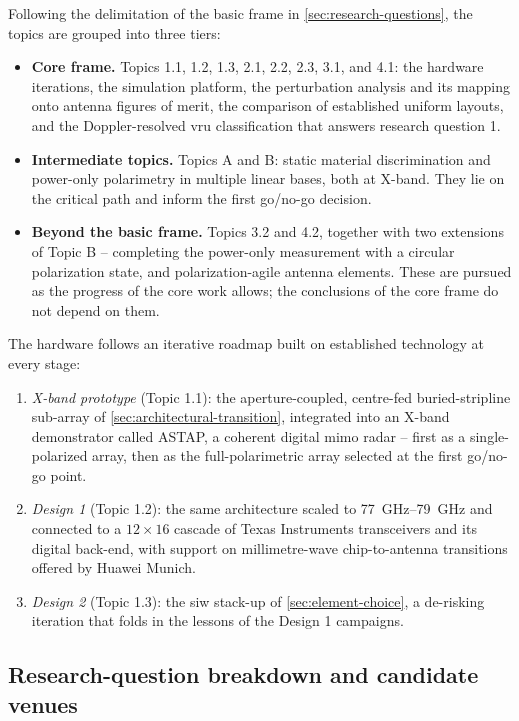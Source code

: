 Following the delimitation of the basic frame in \cref{sec:research-questions}, the topics are grouped into three tiers:
\begin{itemize}
    \item \textbf{Core frame.} Topics 1.1, 1.2, 1.3, 2.1, 2.2, 2.3, 3.1, and 4.1: the hardware iterations, the simulation platform, the perturbation analysis and its mapping onto antenna figures of merit, the comparison of established uniform layouts, and the Doppler-resolved \gls{vru} classification that answers research question 1.
    \item \textbf{Intermediate topics.} Topics A and B: static material discrimination and power-only polarimetry in multiple linear bases, both at X-band.
    They lie on the critical path and inform the first go/no-go decision.
    \item \textbf{Beyond the basic frame.} Topics 3.2 and 4.2, together with two extensions of Topic B -- completing the power-only measurement with a circular polarization state, and polarization-agile antenna elements.
    These are pursued as the progress of the core work allows; the conclusions of the core frame do not depend on them.
\end{itemize}

The hardware follows an iterative roadmap built on established technology at every stage:
\begin{enumerate}
    \item \textit{X-band prototype} (Topic 1.1): the aperture-coupled, centre-fed buried-stripline sub-array of \cref{sec:architectural-transition}, integrated into an X-band demonstrator called ASTAP, a coherent digital \gls{mimo} radar -- first as a single-polarized array, then as the full-polarimetric array selected at the first go/no-go point.
    \item \textit{Design 1} (Topic 1.2): the same architecture scaled to \qtyrange{77}{79}{\giga\hertz} and connected to a $12 \times 16$ cascade of Texas Instruments transceivers and its digital back-end, with support on millimetre-wave chip-to-antenna transitions offered by Huawei Munich.
    \item \textit{Design 2} (Topic 1.3): the \gls{siw} stack-up of \cref{sec:element-choice}, a de-risking iteration that folds in the lessons of the Design 1 campaigns.
\end{enumerate}


\subsection{Research-question breakdown and candidate venues}
\label{sec:rq-breakdown-venues}

